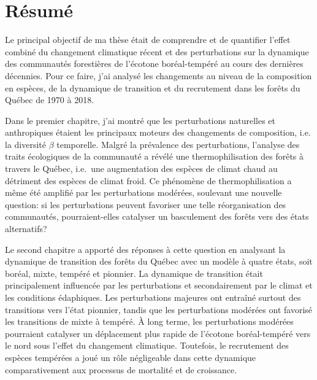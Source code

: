 \francais

\chapter*{Résumé}

Le principal objectif de ma thèse était de comprendre et de quantifier
l'effet combiné du changement climatique récent et des perturbations sur
la dynamique des communautés forestières de l'écotone boréal-tempéré au
cours des dernières décennies. Pour ce faire, j'ai analysé les
changements au niveau de la composition en espèces, de la dynamique de
transition et du recrutement dans les forêts du Québec de 1970 à 2018.

Dans le premier chapitre, j'ai montré que les perturbations naturelles
et anthropiques étaient les principaux moteurs des changements de
composition, i.e. la diversité \(\beta\) temporelle. Malgré la
prévalence des perturbations, l'analyse des traits écologiques de la
communauté a révélé une thermophilisation des forêts à travers le
Québec, i.e.~une augmentation des espèces de climat chaud au détriment
des espèces de climat froid. Ce phénomène de thermophilisation a même
été amplifié par les perturbations modérées, soulevant une nouvelle
question: si les perturbations peuvent favoriser une telle
réorganisation des communautés, pourraient-elles catalyser un
basculement des forêts vers des états alternatifs?

Le second chapitre a apporté des réponses à cette question en analysant
la dynamique de transition des forêts du Québec avec un modèle à quatre
états, soit boréal, mixte, tempéré et pionnier. La dynamique de
transition était principalement influencée par les perturbations et
secondairement par le climat et les conditions édaphiques. Les
perturbations majeures ont entraîné surtout des transitions vers l'état
pionnier, tandis que les perturbations modérées ont favorisé les
transitions de mixte à tempéré. À long terme, les perturbations modérées
pourraient catalyser un déplacement plus rapide de l'écotone
boréal-tempéré vers le nord sous l'effet du changement climatique.
Toutefois, le recrutement des espèces tempérées a joué un rôle
négligeable dans cette dynamique comparativement aux processus de
mortalité et de croissance.

